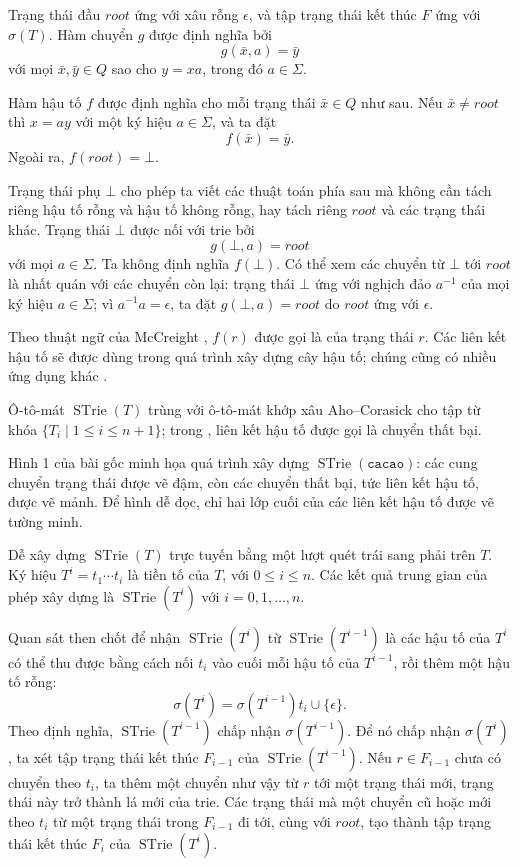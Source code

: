 \documentclass[11pt]{article}
\newcommand{\eps}{\epsilon}
\newcommand{\STrie}{\operatorname{STrie}}
\begin{document}
Trạng thái đầu $\mathit{root}$ ứng với xâu rỗng $\eps$, và tập trạng thái kết
thúc $F$ ứng với $\sigma(T)$. Hàm chuyển $g$ được định nghĩa bởi
\[
  g(\bar{x},a)=\bar{y}
\]
với mọi $\bar{x},\bar{y}\in Q$ sao cho $y=xa$, trong đó $a\in\Sigma$.

Hàm hậu tố $f$ được định nghĩa cho mỗi trạng thái $\bar{x}\in Q$ như sau. Nếu
$\bar{x}\ne\mathit{root}$ thì $x=ay$ với một ký hiệu $a\in\Sigma$, và ta đặt
\[
  f(\bar{x})=\bar{y}.
\]
Ngoài ra, $f(\mathit{root})=\bot$.

Trạng thái phụ $\bot$ cho phép ta viết các thuật toán phía sau mà không cần
tách riêng hậu tố rỗng và hậu tố không rỗng, hay tách riêng $\mathit{root}$
và các trạng thái khác. Trạng thái $\bot$ được nối với trie bởi
\[
  g(\bot,a)=\mathit{root}
\]
với mọi $a\in\Sigma$. Ta không định nghĩa $f(\bot)$. Có thể xem các chuyển từ
$\bot$ tới $\mathit{root}$ là nhất quán với các chuyển còn lại: trạng thái
$\bot$ ứng với nghịch đảo $a^{-1}$ của mọi ký hiệu $a\in\Sigma$; vì
$a^{-1}a=\eps$, ta đặt $g(\bot,a)=\mathit{root}$ do $\mathit{root}$ ứng với
$\eps$.

Theo thuật ngữ của McCreight \cite{mccreight}, $f(r)$ được gọi là
 của trạng thái $r$. Các liên kết hậu tố sẽ được dùng
trong quá trình xây dựng cây hậu tố; chúng cũng có nhiều ứng dụng khác
\cite{ukkonen-cpm,ukkonen-wood}.

Ô-tô-mát $\STrie(T)$ trùng với ô-tô-mát khớp xâu Aho--Corasick
\cite{aho-corasick} cho tập từ khóa $\{T_i\mid 1\le i\le n+1\}$; trong
\cite{aho-corasick}, liên kết hậu tố được gọi là chuyển thất bại.

Hình 1 của bài gốc minh họa quá trình xây dựng $\STrie(\texttt{cacao})$:
các cung chuyển trạng thái được vẽ đậm, còn các chuyển thất bại, tức liên kết
hậu tố, được vẽ mảnh. Để hình dễ đọc, chỉ hai lớp cuối của các liên kết hậu tố
được vẽ tường minh.

Dễ xây dựng $\STrie(T)$ trực tuyến bằng một lượt quét trái sang phải trên
$T$. Ký hiệu $T^i=t_1\cdots t_i$ là tiền tố của $T$, với $0\le i\le n$. Các
kết quả trung gian của phép xây dựng là $\STrie(T^i)$ với
$i=0,1,\ldots,n$.

Quan sát then chốt để nhận $\STrie(T^i)$ từ $\STrie(T^{i-1})$ là các hậu tố
của $T^i$ có thể thu được bằng cách nối $t_i$ vào cuối mỗi hậu tố của
$T^{i-1}$, rồi thêm một hậu tố rỗng:
\[
  \sigma(T^i)=\sigma(T^{i-1})t_i\cup\{\eps\}.
\]
Theo định nghĩa, $\STrie(T^{i-1})$ chấp nhận $\sigma(T^{i-1})$. Để nó chấp
nhận $\sigma(T^i)$, ta xét tập trạng thái kết thúc $F_{i-1}$ của
$\STrie(T^{i-1})$. Nếu $r\in F_{i-1}$ chưa có chuyển theo $t_i$, ta thêm một
chuyển như vậy từ $r$ tới một trạng thái mới, trạng thái này trở thành lá mới
của trie. Các trạng thái mà một chuyển cũ hoặc mới theo $t_i$ từ một trạng
thái trong $F_{i-1}$ đi tới, cùng với $\mathit{root}$, tạo thành tập trạng
thái kết thúc $F_i$ của $\STrie(T^i)$.
\end{document}

